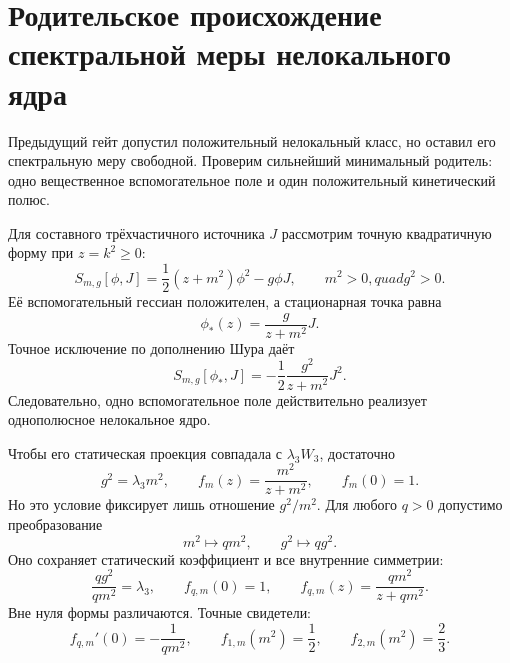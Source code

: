 \chapter{Родительское происхождение спектральной меры нелокального ядра}
\label{ch:v8-baryon-nonlocal-kernel-spectral-measure-parent-origin-gate}

Предыдущий гейт допустил положительный нелокальный класс, но оставил его
спектральную меру свободной. Проверим сильнейший минимальный родитель: одно
вещественное вспомогательное поле и один положительный кинетический полюс.

Для составного трёхчастичного источника $J$ рассмотрим точную квадратичную
форму при $z=k^2\geq0$:
\begin{equation}
 S_{m,g}[\phi,J]
 =\frac12(z+m^2)\phi^2-g\phi J,
 \qquad m^2>0,quad g^2>0.
 \label{eq:v8-baryon-spectral-parent-action}
\end{equation}
Её вспомогательный гессиан положителен, а стационарная точка равна
\begin{equation}
 \phi_*(z)=\frac{g}{z+m^2}J.
 \label{eq:v8-baryon-spectral-parent-stationary-field}
\end{equation}
Точное исключение по дополнению Шура даёт
\begin{equation}
 S_{m,g}[\phi_*,J]
 =-\frac12\frac{g^2}{z+m^2}J^2.
 \label{eq:v8-baryon-spectral-parent-schur-kernel}
\end{equation}
Следовательно, одно вспомогательное поле действительно реализует
однополюсное нелокальное ядро.

Чтобы его статическая проекция совпадала с $\lambda_3W_3$, достаточно
\begin{equation}
 g^2=\lambda_3m^2,
 \qquad
 f_m(z)=\frac{m^2}{z+m^2},
 \qquad f_m(0)=1.
 \label{eq:v8-baryon-spectral-parent-static-matching}
\end{equation}
Но это условие фиксирует лишь отношение $g^2/m^2$. Для любого $q>0$
допустимо преобразование
\begin{equation}
 m^2\longmapsto q m^2,
 \qquad
 g^2\longmapsto q g^2.
 \label{eq:v8-baryon-spectral-parent-scale-orbit}
\end{equation}
Оно сохраняет статический коэффициент и все внутренние симметрии:
\begin{equation}
 \frac{qg^2}{qm^2}=\lambda_3,
 \qquad
 f_{q,m}(0)=1,
 \qquad
 f_{q,m}(z)=\frac{qm^2}{z+qm^2}.
 \label{eq:v8-baryon-spectral-parent-scale-invariance}
\end{equation}
Вне нуля формы различаются. Точные свидетели:
\begin{equation}
 f_{q,m}'(0)=-\frac1{qm^2},
 \qquad
 f_{1,m}(m^2)=\frac12,
 \qquad
 f_{2,m}(m^2)=\frac23.
 \label{eq:v8-baryon-spectral-parent-scale-witnesses}
\end{equation}

